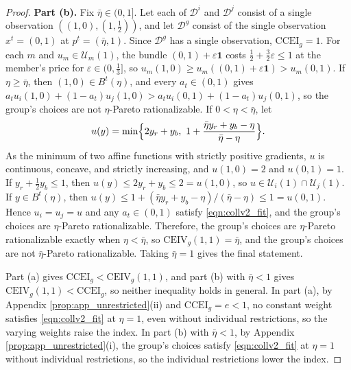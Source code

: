 \documentclass[11 pt]{article}
\begin{document}
\begin{proof}
\textbf{Part (b).} Fix $\bar\eta \in (0,1]$. Let each of $\mathcal{D}^{i}$ and $\mathcal{D}^{j}$ consist of a single observation $((1,0), (1, \tfrac{1}{2}))$, and let $\mathcal{D}^{g}$ consist of the single observation $x^{t} = (0,1)$ at $p^{t} = (\bar\eta, 1)$. Since $\mathcal{D}^{g}$ has a single observation, $\mathrm{CCEI}_{g} = 1$. For each $m$ and $u_{m} \in \mathcal{U}_{m}(1)$, the bundle $(0,1) + \varepsilon \mathbf{1}$ costs $\tfrac{1}{2} + \tfrac{3}{2} \varepsilon \leq 1$ at the member's price for $\varepsilon \in (0, \tfrac{1}{3}]$, so $u_{m}(1,0) \geq u_{m}((0,1) + \varepsilon \mathbf{1}) > u_{m}(0,1)$. If $\eta \geq \bar\eta$, then $(1,0) \in B^{t}(\eta)$, and every $a_{t} \in (0,1)$ gives $a_{t} u_{i}(1,0) + (1-a_{t}) u_{j}(1,0) > a_{t} u_{i}(0,1) + (1-a_{t}) u_{j}(0,1)$, so the group's choices are not $\eta$-Pareto rationalizable. If $0 < \eta < \bar\eta$, let
\begin{align*}
u(y) = \min \Bigl\{ 2 y_{r} + y_{b},\ 1 + \frac{\bar\eta y_{r} + y_{b} - \eta}{\bar\eta - \eta} \Bigr\}.
\end{align*}
As the minimum of two affine functions with strictly positive gradients, $u$ is continuous, concave, and strictly increasing, and $u(1,0) = 2$ and $u(0,1) = 1$. If $y_{r} + \tfrac{1}{2} y_{b} \leq 1$, then $u(y) \leq 2 y_{r} + y_{b} \leq 2 = u(1,0)$, so $u \in \mathcal{U}_{i}(1) \cap \mathcal{U}_{j}(1)$. If $y \in B^{t}(\eta)$, then $u(y) \leq 1 + (\bar\eta y_{r} + y_{b} - \eta)/(\bar\eta - \eta) \leq 1 = u(0,1)$. Hence $u_{i} = u_{j} = u$ and any $a_{t} \in (0,1)$ satisfy \eqref{eqn:collv2_fit}, and the group's choices are $\eta$-Pareto rationalizable. Therefore, the group's choices are $\eta$-Pareto rationalizable exactly when $\eta < \bar\eta$, so $\mathrm{CEIV}_{g}(1,1) = \bar\eta$, and the group's choices are not $\bar\eta$-Pareto rationalizable. Taking $\bar\eta = 1$ gives the final statement.

Part (a) gives $\mathrm{CCEI}_{g} < \mathrm{CEIV}_{g}(1,1)$, and part (b) with $\bar\eta < 1$ gives $\mathrm{CEIV}_{g}(1,1) < \mathrm{CCEI}_{g}$, so neither inequality holds in general. In part (a), by Appendix \autoref{prop:app_unrestricted}(ii) and $\mathrm{CCEI}_{g} = e < 1$, no constant weight satisfies \eqref{eqn:collv2_fit} at $\eta = 1$, even without individual restrictions, so the varying weights raise the index. In part (b) with $\bar\eta < 1$, by Appendix \autoref{prop:app_unrestricted}(i), the group's choices satisfy \eqref{eqn:collv2_fit} at $\eta = 1$ without individual restrictions, so the individual restrictions lower the index.
\end{proof}
\end{document}
